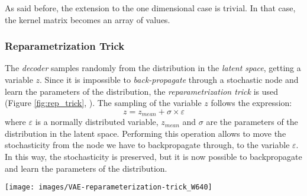 \documentclass[12pt,a4paper,twocolumn]{article}
\begin{document}
		As said before, the extension to the one dimensional case is trivial. In that case, the kernel matrix becomes an array of values.

		\subsubsection{Reparametrization Trick}
		The \emph{decoder} samples randomly from the distribution in the \emph{latent space}, getting a variable $z$. Since it is impossible to \emph{back-propagate} through a stochastic node and learn the parameters of the distribution, the  \emph{reparametrization trick} is used  (Figure \ref{fig:rep_trick}, \cite{rep_trick}). The sampling of the variable $z$  follows the expression:
		 $$z = z_{mean} + \sigma\times\varepsilon$$ 
		 where $\varepsilon$ is a normally distributed variable, $z_{mean}$ and $\sigma$ are the parameters of the distribution in the latent space. Performing this operation allows to move the stochasticity from the node we have to backpropagate through, to the variable $\varepsilon$.
		 In this way, the stochasticity is preserved, but it is now possible to backpropagate and learn the parameters of the distribution.
		 
		\begin{figure*}[t]
			\centering
			\texttt{[image: images/VAE-reparameterization-trick\_W640]}
			\caption{In this Figure it is possible to appreciate the differences in the two approaches for the sampling of the latent distributions. On the left side we have the original approach, where the stochasticity is present in the $Z$ node. This prevent the backpropagation and the learning of the NN. On the left side, the stochastic part is moved through the parameter $\varepsilon$, allowing the backpropagation through the node $Z$.}
			\label{fig:rep_trick}
		\end{figure*}
	
\end{document}
